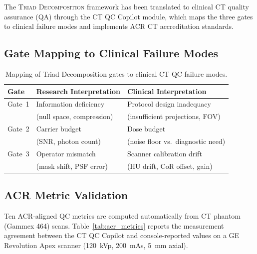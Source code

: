 \documentclass[11pt]{article}
\begin{document}
The \textsc{Triad Decomposition} framework has been translated to clinical
CT quality assurance (QA) through the CT QC Copilot module, which maps
the three gates to clinical failure modes and implements ACR CT
accreditation standards.

\subsection{Gate Mapping to Clinical Failure Modes}

\begin{table}[htbp]
\centering
\caption{Mapping of Triad Decomposition gates to clinical CT QC failure modes.}
\label{tab:gate_mapping}
\begin{tabular}{l l l}
\toprule
\textbf{Gate} & \textbf{Research Interpretation} & \textbf{Clinical Interpretation} \\
\midrule
Gate~1 & Information deficiency       & Protocol design inadequacy \\
       & (null space, compression)     & (insufficient projections, FOV) \\
\midrule
Gate~2 & Carrier budget               & Dose budget \\
       & (SNR, photon count)          & (noise floor vs.\ diagnostic need) \\
\midrule
Gate~3 & Operator mismatch            & Scanner calibration drift \\
       & (mask shift, PSF error)      & (HU drift, CoR offset, gain) \\
\bottomrule
\end{tabular}
\end{table}

\subsection{ACR Metric Validation}

Ten ACR-aligned QC metrics are computed automatically from CT phantom
(Gammex 464) scans.  Table~\ref{tab:acr_metrics} reports the measurement
agreement between the CT QC Copilot and console-reported values on a GE
Revolution Apex scanner (120~kVp, 200~mAs, 5~mm axial).
\end{document}
